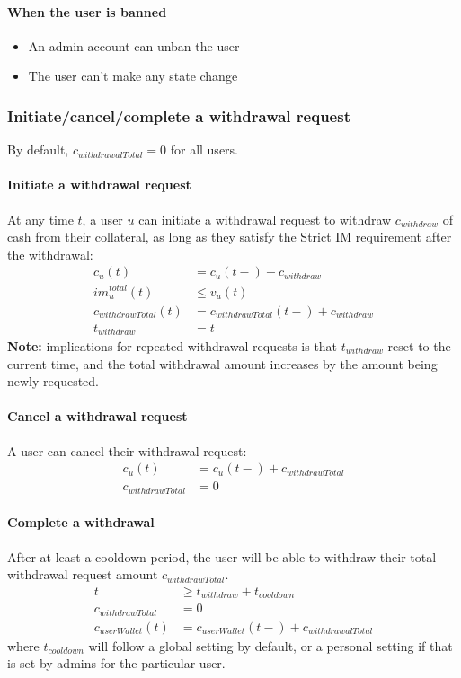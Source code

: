 \documentclass{article}%
\begin{document}
\paragraph{When the user is banned}
\begin{itemize}
    \item An admin account can unban the user
    \item The user can't make any state change
\end{itemize}

\subsubsection{Initiate/cancel/complete a withdrawal request}
By default, $c_{withdrawalTotal} = 0$ for all users.
\paragraph{Initiate a withdrawal request}
At any time $t$, a user $u$ can initiate a withdrawal request to withdraw $c_{withdraw}$ of cash from their collateral, as long as they satisfy the Strict IM requirement after the withdrawal:
\begin{align*}
    c_u(t) &= c_u(t-) - c_{withdraw}\\
    im_u^{total}(t) &\leq v_u(t)\\
    c_{withdrawTotal}(t) &= c_{withdrawTotal}(t-) + c_{withdraw}\\
    t_{withdraw} &= t
\end{align*}
\textbf{Note:} implications for repeated withdrawal requests is that $t_{withdraw}$ reset to the current time, and the total withdrawal amount increases by the amount being newly requested.

\paragraph{Cancel a withdrawal request}
A user can cancel their withdrawal request:
\begin{align*}
    c_u(t) &= c_u(t-) + c_{withdrawTotal}\\
    c_{withdrawTotal} &= 0
\end{align*}

\paragraph{Complete a withdrawal}
After at least a cooldown period, the user will be able to withdraw their total withdrawal request amount $c_{withdrawTotal}$.
\begin{align*}
    t &\geq t_{withdraw} + t_{cooldown}\\
    c_{withdrawTotal} &= 0\\
    c_{userWallet}(t) &= c_{userWallet}(t-) + c_{withdrawalTotal}
\end{align*}
where $t_{cooldown}$ will follow a global setting by default, or a personal setting if that is set by admins for the particular user.
\end{document}
